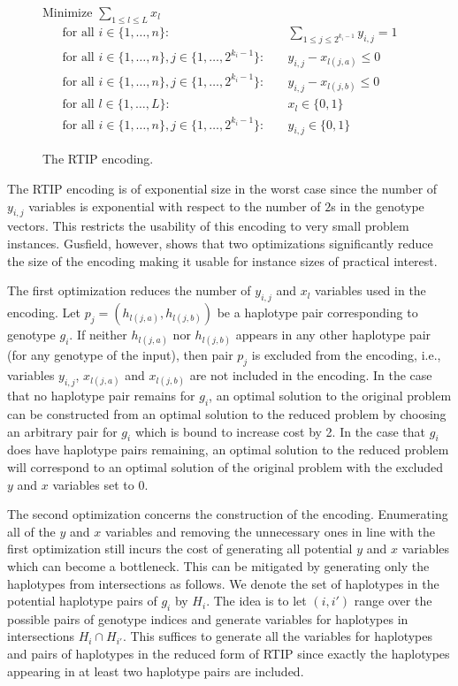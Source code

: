 \documentclass[12pt,a4paper]{article}
\begin{document}
\begin{figure}
\centering
Minimize $\sum_{1\leq l \leq L} x_l$
\begin{align}
\text{for all  }i\in\{1,\dots , n\}:&\quad \sum_{1\leq j \leq 2^{k_i-1}} y_{i,j} = 1 \\
\text{for all  }i\in\{1,\dots , n\}, j\in\{1,\dots , 2^{k_i-1}\}:& \quad y_{i,j} - x_{l(j,a)}  \leq  0 \\
\text{for all  }i\in\{1,\dots , n\}, j\in\{1,\dots , 2^{k_i-1}\}:&\quad y_{i,j} - x_{l(j,b)}  \leq  0 \\
\text{for all  }l\in\{1,\dots , L\}:&\quad x_l \in \{0,1\} \\
\text{for all  }i\in\{1,\dots , n\}, j\in\{1,\dots , 2^{k_i-1}\}:&\quad y_{i,j} \in \{0,1\} 
\end{align}
\caption{The RTIP encoding.}
\label{fig:enc-rtip}
\end{figure}

The RTIP encoding is of exponential size in the worst case since  the number of $y_{i,j}$ variables is exponential with respect to the number of $2$s in the genotype vectors.
This restricts the usability of this encoding to very small problem instances.
Gusfield, however, shows that two optimizations significantly reduce the size of the encoding making it usable for instance sizes of practical interest.

The first optimization reduces the number of $y_{i,j}$ and $x_l$ variables used in the encoding.
Let $p_j=(h_{l(j,a)}, h_{l(j,b)})$ be a haplotype pair corresponding to genotype $g_i$.
If neither $h_{l(j,a)}$ nor $h_{l(j,b)}$ appears in any other haplotype pair (for any genotype of the input), 
then pair $p_j$ is excluded from the encoding, i.e., 
variables $y_{i,j}$, $x_{l(j,a)}$ and $x_{l(j,b)}$ are not included in the encoding.
In the case that no haplotype pair remains for $g_i$, an optimal solution to the original problem can be constructed from an optimal solution to the reduced problem by choosing an arbitrary pair for $g_i$ which is bound to increase cost by 2.
In the case that $g_i$ does have haplotype pairs remaining, an optimal solution to the reduced problem will correspond to an optimal solution of the original problem with the excluded $y$ and $x$ variables set to $0$.

The second optimization concerns the construction of the encoding.
Enumerating all of the $y$ and $x$ variables and removing the unnecessary ones in line with the first optimization still incurs the cost of generating all potential $y$ and $x$ variables which can become a bottleneck.
This can be mitigated by generating only the haplotypes from intersections as follows.
We denote the set of haplotypes in the potential haplotype pairs of $g_i$ by $H_i$.
The idea is to let $(i,i')$ range over the possible pairs of genotype indices and generate variables for haplotypes in intersections $H_i\cap H_{i'}$.
This suffices to generate all the variables for haplotypes and pairs of haplotypes in the reduced form of RTIP since exactly the haplotypes appearing in at least two haplotype pairs are included.
\end{document}
